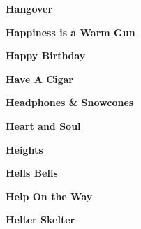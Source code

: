 \begin{center}\textbf{Hangover}\end{center}
\newline
\vspace{10pt} 
\begin{center}\textbf{Happiness is a Warm Gun}\end{center}
\newline
\vspace{10pt} 
\begin{center}\textbf{Happy Birthday}\end{center}
\newline
\vspace{10pt} 
\begin{center}\textbf{Have A Cigar}\end{center}
\newline
\vspace{10pt} 
\begin{center}\textbf{Headphones \& Snowcones}\end{center}
\newline
\vspace{10pt} 
\begin{center}\textbf{Heart and Soul}\end{center}
\newline
\vspace{10pt} 
\begin{center}\textbf{Heights}\end{center}
\newline
\vspace{10pt} 
\begin{center}\textbf{Hells Bells}\end{center}
\newline
\vspace{10pt} 
\begin{center}\textbf{Help On the Way}\end{center}
\newline
\vspace{10pt} 
\begin{center}\textbf{Helter Skelter}\end{center}
